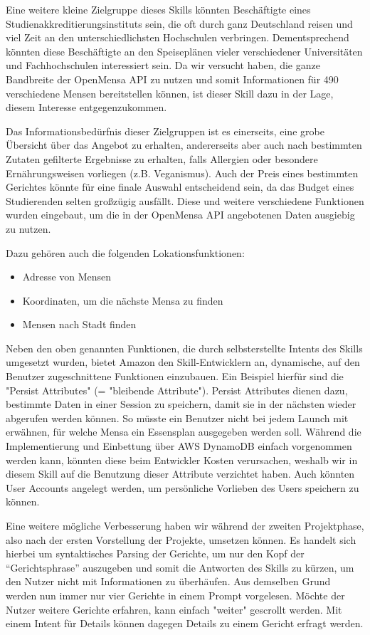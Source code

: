 \documentclass[12pt]{article}
\begin{document}
Eine weitere kleine Zielgruppe dieses Skills könnten Beschäftigte eines Studienakkreditierungsinstituts sein, die oft durch ganz Deutschland reisen und viel Zeit an den unterschiedlichsten Hochschulen verbringen.
Dementsprechend könnten diese Beschäftigte an den Speiseplänen vieler verschiedener Universitäten und Fachhochschulen interessiert sein.
Da wir versucht haben, die ganze Bandbreite der OpenMensa API zu nutzen und somit Informationen für 490 verschiedene Mensen bereitstellen können, ist dieser Skill dazu in der Lage, diesem Interesse entgegenzukommen.

Das Informationsbedürfnis dieser Zielgruppen ist es einerseits, eine grobe Übersicht über das Angebot zu erhalten, andererseits aber auch nach bestimmten Zutaten gefilterte Ergebnisse zu erhalten, falls Allergien oder besondere Ernährungsweisen vorliegen (z.B. Veganismus).
Auch der Preis eines bestimmten Gerichtes könnte für eine finale Auswahl entscheidend sein, da das Budget eines Studierenden selten großzügig ausfällt.
Diese und weitere verschiedene Funktionen wurden eingebaut, um die in der OpenMensa API angebotenen Daten ausgiebig zu nutzen.

Dazu gehören auch die folgenden Lokationsfunktionen:
\begin{itemize}
  \setlength\itemsep{0em}
  \item Adresse von Mensen
  \item Koordinaten, um die nächste Mensa zu finden
  \item Mensen nach Stadt finden
\end{itemize}

Neben den oben genannten Funktionen, die durch selbsterstellte Intents des Skills umgesetzt wurden, bietet Amazon den Skill-Entwicklern an, dynamische, auf den Benutzer zugeschnittene Funktionen einzubauen. 
Ein Beispiel hierfür sind die "Persist Attributes" (= "bleibende Attribute").
Persist Attributes dienen dazu, bestimmte Daten in einer Session zu speichern, damit sie in der nächsten wieder abgerufen werden können.
So müsste ein Benutzer nicht bei jedem Launch mit erwähnen, für welche Mensa ein Essensplan ausgegeben werden soll.
Während die Implementierung und Einbettung über AWS DynamoDB einfach vorgenommen werden kann, könnten diese beim Entwickler Kosten verursachen, weshalb wir in diesem Skill auf die Benutzung dieser Attribute verzichtet haben.
Auch könnten User Accounts angelegt werden, um persönliche Vorlieben des Users speichern zu können. 

Eine weitere mögliche Verbesserung haben wir während der zweiten Projektphase, also nach der ersten Vorstellung der Projekte, umsetzen können.
Es handelt sich hierbei um syntaktisches Parsing der Gerichte, um nur den Kopf der “Gerichtsphrase” auszugeben und somit die Antworten des Skills zu kürzen, um den Nutzer nicht mit Informationen zu überhäufen.
Aus demselben Grund werden nun immer nur vier Gerichte in einem Prompt vorgelesen.
Möchte der Nutzer weitere Gerichte erfahren, kann einfach "weiter" gescrollt werden. Mit einem Intent für Details können dagegen Details zu einem Gericht erfragt werden.
\end{document}
